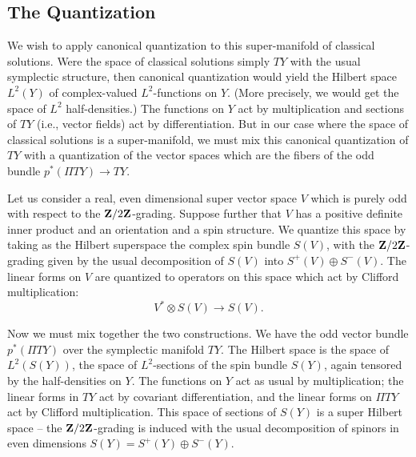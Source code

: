 \subsection{The Quantization}

We wish to apply canonical quantization to this super-manifold of
classical solutions.  Were the space of classical solutions simply
$TY$ with the usual symplectic structure, then canonical quantization
would yield the Hilbert space $L^2(Y)$ of complex-valued $L^2$-functions on
$Y$. (More precisely, we would get the space of $L^2$ half-densities.)
The functions on $Y$ act by multiplication and sections of $TY$
(i.e., vector fields) act by 
differentiation. But in our case where the space of classical
solutions is a super-manifold, we must mix this canonical quantization
of $TY$ with a quantization of the vector spaces which are the fibers
of the odd bundle $p^*(\Pi TY)\to TY$.

Let us consider a real, even dimensional super vector space $V$ which is
purely odd  with respect to the ${\bf Z}/2{\bf Z}$-grading.
Suppose further that $V$ has  a positive
definite inner product and an orientation and a spin structure.
We quantize this space by taking as the Hilbert superspace
the complex spin bundle $S(V)$, with the ${\bf Z}/2{\bf Z}$-grading given by
the usual decomposition of $S(V)$ into $S^+(V)\oplus S^-(V)$.  The
linear forms on $V$ are quantized to 
operators  on this space which act by Clifford multiplication:
$$V^*\otimes S(V)\to S(V).$$ 

Now we must mix together the two constructions.
We have the odd vector bundle $p^*(\Pi TY)$ over the symplectic
manifold $TY$. The Hilbert space is the 
space of $L^2(S(Y))$, the space of $L^2$-sections of the spin bundle
 $S(Y)$, again tensored by the half-densities on $Y$.
The functions on $Y$ act as usual by multiplication; the linear forms
in $TY$ act by covariant differentiation, and the linear forms on $\Pi
TY$ act by Clifford multiplication.
This space of sections of $S(Y)$ is  a super Hilbert space -- the
${\bf Z}/2{\bf Z}$-grading 
is induced with the usual decomposition of spinors in
even dimensions $S(Y)=S^+(Y)\oplus S^-(Y)$.

